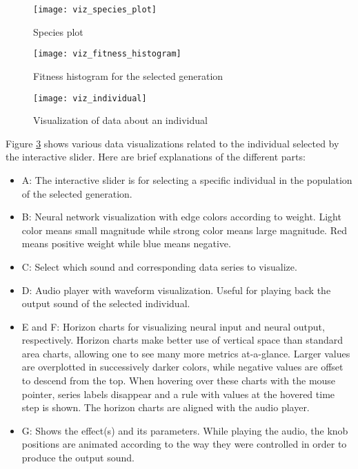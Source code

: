 \begin{figure}[H]
    \centering
    \texttt{[image: viz\_species\_plot]}
    \caption{Species plot}
    \label{fig:viz_species_plot}
\end{figure}

\begin{figure}[H]
    \centering
    \texttt{[image: viz\_fitness\_histogram]}
    \caption{Fitness histogram for the selected generation}
    \label{fig:viz_fitness_histogram}
\end{figure}

\begin{figure}[H]
    \centering
    \texttt{[image: viz\_individual]}
    \caption{Visualization of data about an individual}
    \label{fig:viz_individual}
\end{figure}

Figure \ref{fig:viz_individual} shows various data visualizations related to the individual selected by the interactive slider. Here are brief explanations of the different parts:
\begin{itemize}
\item A: The interactive slider is for selecting a specific individual in the population of the selected generation.
\item B: Neural network visualization with edge colors according to weight. Light color means small magnitude while strong color means large magnitude. Red means positive weight while blue means negative.
\item C: Select which sound and corresponding data series to visualize.
\item D: Audio player with waveform visualization. Useful for playing back the output sound of the selected individual.
\item E and F: Horizon charts for visualizing neural input and neural output, respectively. Horizon charts make better use of vertical space than standard area charts, allowing one to see many more metrics at-a-glance. Larger values are overplotted in successively darker colors, while negative values are offset to descend from the top. When hovering over these charts with the mouse pointer, series labels disappear and a rule with values at the hovered time step is shown. The horizon charts are aligned with the audio player.
\item G: Shows the effect(s) and its parameters. While playing the audio, the knob positions are animated according to the way they were controlled in order to produce the output sound.
\end{itemize}

